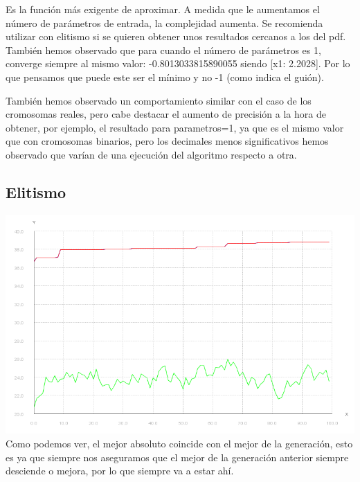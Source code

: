 \documentclass{article}
\begin{document}
Es la función más exigente de aproximar. A medida que le aumentamos el número de parámetros de entrada, la complejidad aumenta. Se recomienda utilizar con elitismo si se quieren obtener unos resultados cercanos a los del pdf. También hemos observado que para cuando el número de parámetros es 1, converge siempre al mismo valor: -0.8013033815890055 siendo [x1: 2.2028]. Por lo que pensamos que puede este ser el mínimo y no -1 (como indica el guión). 

También hemos observado un comportamiento similar con el caso de los cromosomas reales, pero cabe destacar el aumento de precisión a la hora de obtener, por ejemplo, el resultado para parametros=1, ya que es el mismo valor que con cromosomas binarios, pero los decimales menos significativos hemos observado que varían de una ejecución del algoritmo respecto a otra.
\subsection{Elitismo}
\includegraphics[scale=0.5]{./images/graph1_eli.png}
Como podemos ver, el mejor absoluto coincide con el mejor de la generación, esto es ya que siempre nos aseguramos que el mejor de la generación anterior siempre desciende o mejora, por lo que siempre va a estar ahí.
\end{document}

